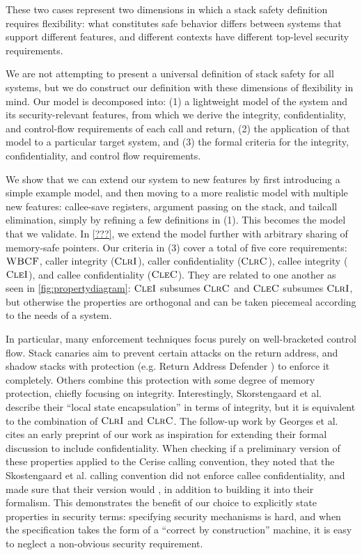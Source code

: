 \documentclass[10pt,conference]{ieeetran}%
\theoremstyle{definition}
\begin{document}
These two cases represent two dimensions in which a stack safety definition requires
flexibility: what constitutes safe behavior differs between systems that support different
features, and different contexts have different top-level security requirements.

We are not attempting to present a universal definition of stack safety for all systems,
but we do construct our definition with these dimensions of flexibility in mind.
Our model is decomposed into:
(1) a lightweight model of the system and its security-relevant features, from which we
derive the integrity, confidentiality, and control-flow requirements of each call and
return, (2) the application of that model to a particular target system, and (3)
the formal criteria for the integrity, confidentiality, and control flow
requirements.

We show that we can extend our system to new features by first introducing a simple
example model, and then moving to a more realistic model with multiple new features:
callee-save registers, argument passing on the stack, and tailcall elimination, simply
by refining a few definitions in (1). This becomes the model that we validate.
In \cref{???}, we extend the model further with arbitrary sharing of memory-safe
pointers. Our criteria in (3) cover a total of five core requirements:
\(\textnormal{\sc WBCF}\), caller integrity (\(\textnormal{\sc ClrI}\)), caller confidentiality (\(\textnormal{\sc ClrC}\)),
callee integrity (\(\textnormal{\sc CleI}\)), and callee confidentiality (\(\textnormal{\sc CleC}\)).
They are related to one another as seen in
\cref{fig:propertydiagram}: \(\textnormal{\sc CleI}\) subsumes \(\textnormal{\sc ClrC}\) and \(\textnormal{\sc CleC}\) subsumes
\(\textnormal{\sc ClrI}\), but otherwise the properties are orthogonal and can be taken piecemeal
according to the needs of a system.

In particular, many enforcement techniques focus purely on
well-bracketed control flow. Stack canaries aim to prevent certain attacks on the return
address, and shadow stacks with protection (e.g. Return Address Defender \cite{Chiueh2001RAD})
to enforce it completely. Others combine this protection with some degree of memory protection,
chiefly focusing on integrity. Interestingly, Skorstengaard et al. \cite{SkorstengaardSTKJFP}
describe their ``local state encapsulation'' in terms of integrity, but it is equivalent
to the combination of \(\textnormal{\sc ClrI}\) and \(\textnormal{\sc ClrC}\). The follow-up work by 
Georges et al. \cite{Georges22:TempsDesCerises} cites an early preprint of our work
as inspiration for extending their formal discussion to include confidentiality.
When checking if a preliminary version of these properties applied to
the Cerise calling convention, they noted that the Skostengaard et al. calling convention
did not enforce callee confidentiality, and made sure that their version would
\cite{Georges22:personalcommunication}, in addition to building it into their formalism.
This demonstrates the benefit of our choice to explicitly state properties in security
terms: specifying security mechanisms is hard, and when the specification takes the
form of a ``correct by construction'' machine, it is easy to neglect a non-obvious
security requirement.
\end{document}
